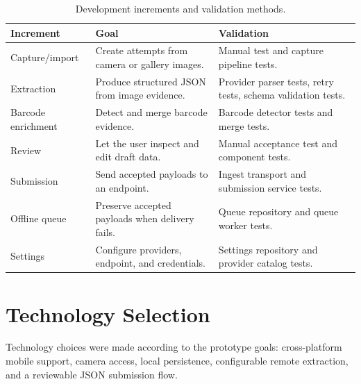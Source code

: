 \begin{table}[H]
\centering
\begin{tabularx}{\textwidth}{P{0.19\textwidth}YY}
\toprule
\textbf{Increment} & \textbf{Goal} & \textbf{Validation} \\
\midrule
Capture/import & Create attempts from camera or gallery images. & Manual test and capture pipeline tests. \\
Extraction & Produce structured JSON from image evidence. & Provider parser tests, retry tests, schema validation tests. \\
Barcode enrichment & Detect and merge barcode evidence. & Barcode detector tests and merge tests. \\
Review & Let the user inspect and edit draft data. & Manual acceptance test and component tests. \\
Submission & Send accepted payloads to an endpoint. & Ingest transport and submission service tests. \\
Offline queue & Preserve accepted payloads when delivery fails. & Queue repository and queue worker tests. \\
Settings & Configure providers, endpoint, and credentials. & Settings repository and provider catalog tests. \\
\bottomrule
\end{tabularx}
\caption{Development increments and validation methods.}
\label{tab:development-increments}
\end{table}

\section{Technology Selection}
\label{sec:technology-selection}

Technology choices were made according to the prototype goals: cross-platform mobile support, camera access, local persistence, configurable remote extraction, and a reviewable JSON submission flow.

